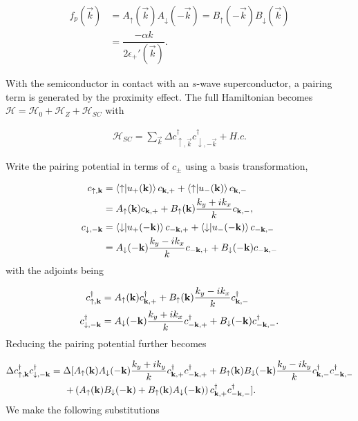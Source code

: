 \begin{align}
  f_p(\vec{k}) &= A_{\uparrow}(\vec{k})A_{\downarrow}(-\vec{k}) = B_{\uparrow}(-\vec{k})B_{\downarrow}(\vec{k}) \\
  &= \dfrac{-\alpha k}{2\epsilon_+'(\vec{k})}.
\end{align}

With the semiconductor in contact with an $s$-wave superconductor, a pairing term is generated by the proximity effect.
The full Hamiltonian becomes $\mathcal{H} = \mathcal{H}_0 + \mathcal{H}_Z + \mathcal{H}_{SC}$ with

\begin{align}
  \mathcal{H}_{SC} = \sum_{\vec{k}} \Delta c_{\uparrow,\vec{k}}^\dagger c_{\downarrow,-\vec{k}}^\dagger + H.c.
\end{align}

Write the pairing potential in terms of $c_{\pm}$ using a basis transformation,

\begin{align}
  c_{\uparrow,\mathbf{k}} &= \bra{\uparrow}\ket{u_+(\mathbf{k})} c_{\mathbf{k},+} + \bra{\uparrow}\ket{u_-(\mathbf{k})} c_{\mathbf{k},-} \\
  &= A_{\uparrow}(\mathbf{k}) c_{\mathbf{k},+} + B_{\uparrow}(\mathbf{k})\dfrac{k_y+i k_x}{k} c_{\mathbf{k},-}, \\
  c_{\downarrow,-\mathbf{k}} &= \bra{\downarrow}\ket{u_+(-\mathbf{k})} c_{-\mathbf{k},+} + \bra{\downarrow}\ket{u_-(-\mathbf{k})} c_{-\mathbf{k},-} \\
  &= A_{\downarrow}(-\mathbf{k})\dfrac{k_y-i k_x}{k} c_{-\mathbf{k},+} + B_{\downarrow}(-\mathbf{k}) c_{-\mathbf{k},-}
\end{align}
with the adjoints being

\begin{align}
  c^{\dagger}_{\uparrow,\mathbf{k}} &= A_{\uparrow}(\mathbf{k}) c^{\dagger}_{\mathbf{k},+} + B_{\uparrow}(\mathbf{k})\dfrac{k_y-i k_x}{k} c^{\dagger}_{\mathbf{k},-} \\
  c^{\dagger}_{\downarrow,-\mathbf{k}} &= A_{\downarrow}(-\mathbf{k})\dfrac{k_y+i k_x}{k} c^{\dagger}_{-\mathbf{k},+} + B_{\downarrow}(-\mathbf{k}) c^{\dagger}_{-\mathbf{k},-}.
\end{align}
Reducing the pairing potential further becomes

\begin{equation}
  \begin{split}
    \Delta c^{\dagger}_{\uparrow,\mathbf{k}} c^{\dagger}_{\downarrow,-\mathbf{k}} = \Delta [ & A_{\uparrow}(\mathbf{k})A_{\downarrow}(-\mathbf{k})\dfrac{k_y+i k_y}{k} c^{\dagger}_{\mathbf{k},+} c^{\dagger}_{-\mathbf{k},+} + B_{\uparrow}(\mathbf{k})B_{\downarrow}(-\mathbf{k})\dfrac{k_y-i k_y}{k} c^{\dagger}_{\mathbf{k},-} c^{\dagger}_{-\mathbf{k},-} \\
    + & \left(A_{\uparrow}(\mathbf{k})B_{\downarrow}(-\mathbf{k})+B_{\uparrow}(\mathbf{k})A_{\downarrow}(-\mathbf{k}) \right) c^{\dagger}_{\mathbf{k},+} c^{\dagger}_{-\mathbf{k},-} ].
  \end{split}
\end{equation}
We make the following substitutions

